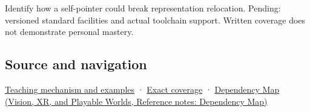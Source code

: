 Identify how a self-pointer could break representation relocation. Pending: versioned standard facilities and actual toolchain support. Written coverage does not demonstrate personal mastery.

\subsection{Source and navigation}\label{appendix-adfd6397af8d-source-and-navigation}

\hyperref[01-foundations-i-ch003-from-three-repairs-to-five-decisions-to-zero-boilerplate]{Teaching mechanism and examples} · \hyperref[appendix-fd090d982a15-m009---parts-127-147]{Exact coverage} · \href{../07-Vision-XR-and-Playable-Worlds/main.pdf\#nameddest=appendix-4ad47bdd269a}{Dependency Map (Vision, XR, and Playable Worlds, Reference notes: Dependency Map)}
